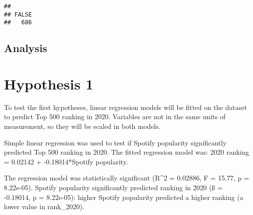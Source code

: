 \documentclass[
]{article}
\newenvironment{Shaded}{\begin{snugshade}}{\end{snugshade}}
\newcommand{\CommentTok}[1]{\textcolor[rgb]{0.56,0.35,0.01}{\textit{#1}}}
\newcommand{\DecValTok}[1]{\textcolor[rgb]{0.00,0.00,0.81}{#1}}
\newcommand{\FunctionTok}[1]{\textcolor[rgb]{0.13,0.29,0.53}{\textbf{#1}}}
\newcommand{\NormalTok}[1]{#1}
\newcommand{\OtherTok}[1]{\textcolor[rgb]{0.56,0.35,0.01}{#1}}
\newcommand{\SpecialCharTok}[1]{\textcolor[rgb]{0.81,0.36,0.00}{\textbf{#1}}}
\newcommand{\StringTok}[1]{\textcolor[rgb]{0.31,0.60,0.02}{#1}}
\begin{document}
\begin{Shaded}
\end{Shaded}

\begin{verbatim}
## 
## FALSE 
##   686
\end{verbatim}

\begin{Shaded}
\end{Shaded}

\subsection{Analysis}\label{analysis}

\section{Hypothesis 1}\label{hypothesis-1}

To test the first hypotheses, linear regression models will be fitted on
the dataset to predict Top 500 ranking in 2020. Variables are not in the
same units of measurement, so they will be scaled in both models.

Simple linear regression was used to test if Spotify popularity
significantly predicted Top 500 ranking in 2020. The fitted regression
model was: 2020 ranking = 0.02142 + -0.18014*Spotify popularity.

The regression model was statistically significant (R\^{}2 = 0.02886, F
= 15.77, p = 8.22e-05). Spotify popularity significantly predicted
ranking in 2020 (ß = -0.18014, p = 8.22e-05): higher Spotify popularity
predicted a higher ranking (a lower value in rank\_2020).
\end{document}
